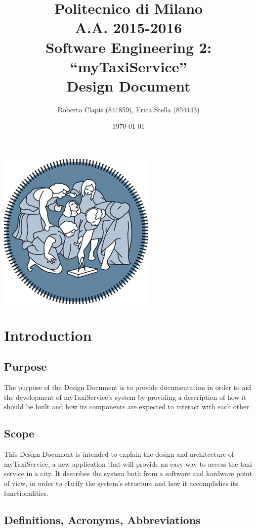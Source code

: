 \documentclass{article}
\author{Roberto Clapis (841859), Erica Stella (854443)}
\date{\today}
\title{Politecnico di Milano
		\\A.A. 2015\@-\@2016
		\\Software Engineering 2: ``myTaxiService''
		\\\textbf{D}esign \textbf{D}ocument}
\begin{document}
\maketitle
\begin{center}
	\includegraphics{polimi-logo}
\end{center}
\clearpage
\tableofcontents
\clearpage


\section{Introduction}
\subsection{Purpose}
The purpose of the Design Document is to provide documentation in order to aid the development of myTaxiService's system by providing a description of how it should be built and how its components are expected to interact with each other.
\subsection{Scope}
This Design Document is intended to explain the design and architecture of myTaxiService, a new application that will provide an easy way to access the taxi service in a city. It describes the system both from a software and hardware point of view, in order to clarify the system's structure and how it accomplishes its functionalities. 
\subsection{Definitions, Acronyms, Abbreviations}
\end{document}
